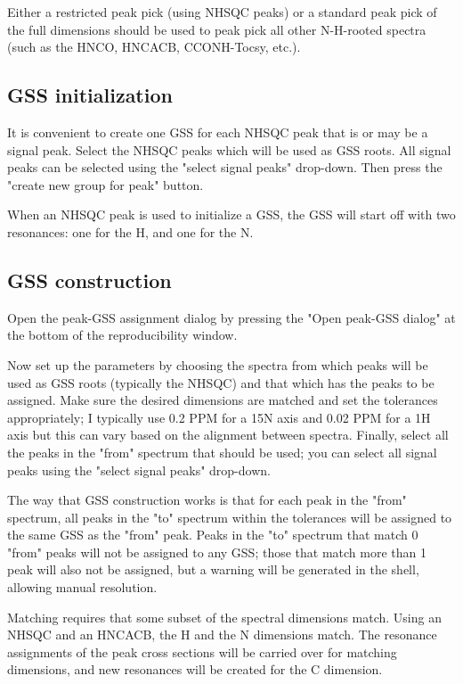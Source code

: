 Either a restricted peak pick (using NHSQC peaks) or a standard peak pick
of the full dimensions should be used to peak pick all other N-H-rooted
spectra (such as the HNCO, HNCACB, CCONH-Tocsy, etc.).

\subsection{GSS initialization}
It is convenient to create one GSS for each NHSQC peak that is or may be
a signal peak.  Select the NHSQC peaks which will be used as GSS roots.  
All signal peaks can be selected using the "select signal peaks" drop-down.
Then press the "create new group for peak" button.

When an NHSQC peak is used to initialize a GSS, the GSS will start off
with two resonances: one for the H, and one for the N.

\subsection{GSS construction}
Open the peak-GSS assignment dialog by pressing the "Open peak-GSS dialog"
at the bottom of the reproducibility window.

Now set up the parameters by choosing the spectra from which peaks will
be used as GSS roots (typically the NHSQC) and that which has the peaks to
be assigned.  Make sure the desired dimensions are matched and set the 
tolerances appropriately; I typically use 0.2 PPM for a 15N axis and 0.02 PPM
for a 1H axis but this can vary based on the alignment between spectra.
Finally, select all the peaks in the "from" spectrum that should be used;
you can select all signal peaks using the "select signal peaks" drop-down.

The way that GSS construction works is that for each peak in the "from"
spectrum, all peaks in the "to" spectrum within the tolerances will be
assigned to the same GSS as the "from" peak.  Peaks in the "to" spectrum that
match 0 "from" peaks will not be assigned to any GSS; those that match more
than 1 peak will also not be assigned, but a warning will be generated in
the shell, allowing manual resolution.

Matching requires that some subset of the spectral dimensions match.  Using
an NHSQC and an HNCACB, the H and the N dimensions match.  The resonance
assignments of the peak cross sections will be carried over for matching dimensions,
and new resonances will be created for the C dimension.

